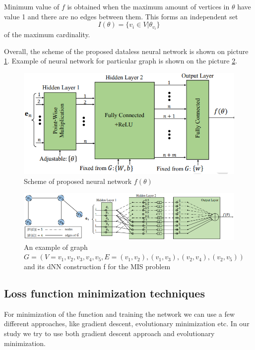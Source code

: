 Minimum value of $f$ is obtained when the maximum amount of vertices in $\theta$ have value 1 and there are no edges between them. This forms an independent set 
\begin{equation}
    I(\theta) = \{ v_i \in V | \theta_{v_i} \}
\end{equation}
 of the maximum cardinality. 
 
Overall, the scheme of the proposed dataless neural network is shown on picture \ref{fig:dnn_scheme}. Example of neural network for particular graph is shown on the picture \ref{fig:dnn_example_1}.

 \begin{figure}[H]
    \centering
    \includegraphics{figures/nn_block_structure.png}
    \caption{Scheme of proposed neural network $f(\theta)$}
    \label{fig:dnn_scheme}
\end{figure}

\begin{figure}[H]
    \centering
    \includegraphics{figures/dnn_example.png}
    \caption{ An example of graph $G = (V = {v_1, v_2, v_3, v_4, v_5}, E =
{(v_1, v_2), (v_1, v_3), (v_2, v_4), (v_2, v_5)})$ and its dNN construction f for the MIS problem}
    \label{fig:dnn_example_1}
\end{figure}

\subsection{Loss function minimization techniques}
For minimization of the function and training the network we can use a few different approaches, like gradient descent, evolutionary minimization etc. 
 In our study we try to use both gradient descent approach and evolutionary minimization.
